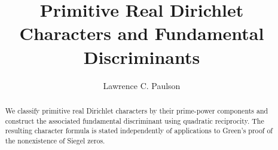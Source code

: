 \documentclass[11pt,a4paper]{article}
\begin{document}
\title{Primitive Real Dirichlet Characters and Fundamental Discriminants}
\author{Lawrence C. Paulson}
\maketitle
\begin{abstract}
We classify primitive real Dirichlet characters by their prime-power components and construct the associated fundamental discriminant using quadratic reciprocity. The resulting character formula is stated independently of applications to Green's proof of the nonexistence of Siegel zeros.
\end{abstract}
\tableofcontents

\end{document}
